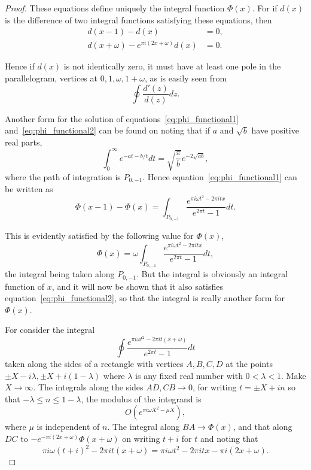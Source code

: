 \documentclass[12pt]{article}
\theoremstyle{remark}
\begin{document}
\begin{proof}
These equations define uniquely the integral function $\Phi(x)$. For if $d(x)$ is the difference of two integral functions satisfying these equations, then
\begin{align}
d(x-1) - d(x) &= 0, \label{eq:d_functional1}\\
d(x+\omega) - e^{\pi i(2x+\omega)} d(x) &= 0. \label{eq:d_functional2}
\end{align}

Hence if $d(x)$ is not identically zero, it must have at least one pole in the parallelogram, vertices at $0, 1, \omega, 1+\omega$, as is easily seen from
\begin{equation}\label{eq:d_residue}
\oint \frac{d'(z)}{d(z)} dz.
\end{equation}

Another form for the solution of equations~\eqref{eq:phi_functional1} and~\eqref{eq:phi_functional2} can be found on noting that if $a$ and $\sqrt{b}$ have positive real parts,
\begin{equation}\label{eq:gaussian_integral}
\int_0^\infty e^{-at - b/t} dt = \sqrt{\frac{\pi}{b}} e^{-2\sqrt{ab}},
\end{equation}
where the path of integration is $P_{0,-1}$. Hence equation~\eqref{eq:phi_functional1} can be written as
\begin{equation}\label{eq:phi_integral_form}
\Phi(x-1) - \Phi(x) = \int_{P_{0,-1}} \frac{e^{\pi i\omega t^2 - 2\pi itx}}{e^{2\pi t} - 1} dt.
\end{equation}

This is evidently satisfied by the following value for $\Phi(x)$,
\begin{equation}\label{eq:phi_solution}
\Phi(x) = \omega \int_{P_{0,-1}} \frac{e^{\pi i\omega t^2 - 2\pi itx}}{e^{2\pi t} - 1} dt,
\end{equation}
the integral being taken along $P_{0,-1}$. But the integral is obviously an integral function of $x$, and it will now be shown that it also satisfies equation~\eqref{eq:phi_functional2}, so that the integral is really another form for $\Phi(x)$.

For consider the integral
\begin{equation}\label{eq:contour_integral}
\oint \frac{e^{\pi i\omega t^2 - 2\pi it(x+\omega)}}{e^{2\pi t} - 1} dt
\end{equation}
taken along the sides of a rectangle with vertices $A, B, C, D$ at the points $\pm X - i\lambda, \pm X + i(1-\lambda)$ where $\lambda$ is any fixed real number with $0 < \lambda < 1$. Make $X \to \infty$. The integrals along the sides $AD, CB \to 0$, for writing $t = \pm X + in$ so that $-\lambda \leq n \leq 1-\lambda$, the modulus of the integrand is
\begin{equation}\label{eq:integrand_bound}
O(e^{\pi i\omega X^2 - \mu X}),
\end{equation}
where $\mu$ is independent of $n$. The integral along $BA \to \Phi(x)$, and that along $DC$ to $-e^{-\pi i(2x+\omega)} \Phi(x+\omega)$ on writing $t + i$ for $t$ and noting that
\begin{equation}\label{eq:shift_identity}
\pi i\omega(t+i)^2 - 2\pi it(x+\omega) = \pi i\omega t^2 - 2\pi itx - \pi i(2x+\omega).
\end{equation}


\end{proof}
\end{document}
